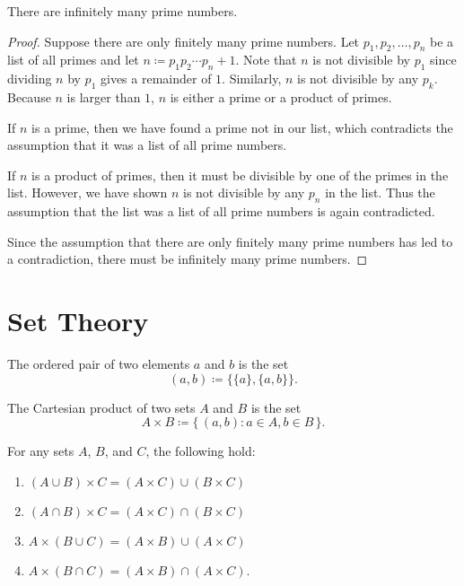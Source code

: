 \documentclass[headings=standardclasses]{scrartcl}
\begin{document}
\begin{theorem}
  There are infinitely many prime numbers.
\end{theorem}

\begin{proof}
  Suppose there are only finitely many prime numbers. Let \(p_1, p_2, \ldots,
  p_n\) be a list of all primes and let \(n \coloneqq p_{1}p_{2} \cdots p_n +
  1\). Note that \(n\) is not divisible by \(p_1\) since dividing \(n\) by
  \(p_1\) gives a remainder of \(1\). Similarly, \(n\) is not divisible by any
  \(p_k\). Because \(n\) is larger than \(1\), \(n\) is either a prime or a
  product of primes.

  If \(n\) is a prime, then we have found a prime not in our list, which
  contradicts the assumption that it was a list of all prime numbers.

  If \(n\) is a product of primes, then it must be divisible by one of the
  primes in the list. However, we have shown \(n\) is not divisible by any
  \(p_n\) in the list. Thus the assumption that the list was a list of all
  prime numbers is again contradicted.

  Since the assumption that there are only finitely many prime numbers has led
  to a contradiction, there must be infinitely many prime numbers.
\end{proof}

\section*{Set Theory}

\begin{definition}\label{def:ordered_pair}
  The ordered pair of two elements \(a\) and \(b\) is the set
  \[ (a, b) ≔ \{\{a\}, \{a, b\}\}. \]
\end{definition}

\begin{definition}\label{def:cartesian_product}
  The Cartesian product of two sets \(A\) and \(B\) is the set
  \[ A × B ≔ \{\, (a, b) : a ∈ A, b ∈ B \,\}. \]
\end{definition}

\begin{theorem}
  For any sets \(A\), \(B\), and \(C\), the following hold:
  \begin{enumerate}[label=(\alph*)]
    \item \((A ∪ B) × C = (A × C) ∪ (B × C)\)
    \item \((A ∩ B) × C = (A × C) ∩ (B × C)\)
    \item \(A × (B ∪ C) = (A × B) ∪ (A × C)\)
    \item \(A × (B ∩ C) = (A × B) ∩ (A × C)\).
  \end{enumerate}
\end{theorem}
\end{document}
